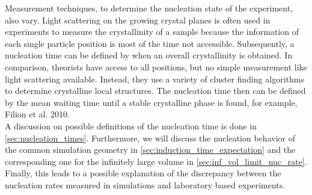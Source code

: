 Measurement techniques, to determine the nucleation state of the experiment, also vary. Light scattering on the growing crystal planes is often used in experiments to measure the crystallinity of a sample because the information of each single particle position is most of the time not accessible. Subsequently, a nucleation time can be defined by when an overall crystallinity is obtained. In comparison, theorists have access to all positions, but no simple measurement like light scattering available. Instead, they use a variety of cluster finding algorithms to determine crystalline local structures. The nucleation time then can be defined by the mean waiting time until a stable crystalline phase is found, for example, Filion et al. 2010\cite{Filion2010a}.\\ 

A discussion on possible definitions of the nucleation time is done in \autoref{sec:nucleation_times}. Furthermore, we will discuss the nucleation behavior of the common simulation geometry in \autoref{sec:induction_time_expectation} and the corresponding one for the infinitely large volume in \autoref{sec:inf_vol_limit_nuc_rate}. Finally, this leads to a possible explanation of the discrepancy between the nucleation rates measured in simulations and laboratory based experiments.

\FloatBarrier
